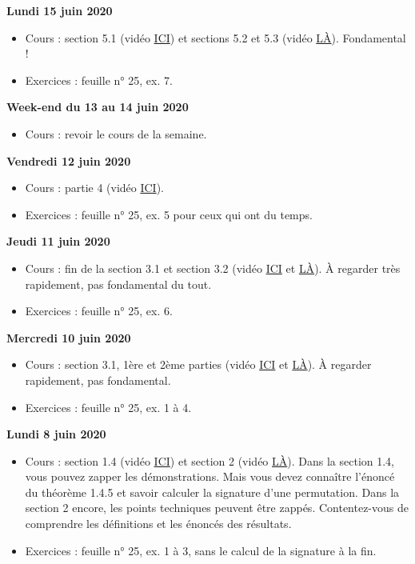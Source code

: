 \documentclass[12pt,a4paper]{article}
\begin{document}
\noindent\textbf{Lundi 15 juin 2020}
\begin{itemize}
\item Cours : section 5.1 (vidéo \href{https://youtu.be/vB5FzVZpJkY}{ ICI}) et sections 5.2 et 5.3  (vidéo \href{https://youtu.be/1X3qrp7tlSw}{ LÀ}). Fondamental !
\item Exercices : feuille n° 25, ex. 7.\vspace{.4cm}
\end{itemize}

\noindent\textbf{Week-end du 13 au 14 juin 2020}
\begin{itemize}
\item Cours : revoir le cours de la semaine.\vspace{.4cm}
\end{itemize}

\noindent\textbf{Vendredi 12 juin 2020}
\begin{itemize}
\item Cours : partie 4 (vidéo \href{https://youtu.be/bxy6vg6_DS0}{ ICI}).
\item Exercices : feuille n° 25, ex. 5 pour ceux qui ont du temps.\vspace{.4cm}
\end{itemize}

\noindent\textbf{Jeudi 11 juin 2020}
\begin{itemize}
\item Cours : fin de la section 3.1 et section 3.2 (vidéo \href{https://youtu.be/LjDFfUYnHZk}{ ICI} et \href{https://youtu.be/-pnLRj_3loA}{ LÀ}). À regarder très rapidement, pas fondamental du tout.
\item Exercices : feuille n° 25, ex. 6.\vspace{.4cm}
\end{itemize}
 
\noindent\textbf{Mercredi 10 juin 2020}
\begin{itemize}
\item Cours : section 3.1, 1ère et 2ème parties (vidéo \href{https://youtu.be/pv299BRWnXQ}{ ICI} et \href{https://youtu.be/LRI5gsSShV4}{ LÀ}). À regarder rapidement, pas fondamental.
\item Exercices : feuille n° 25, ex. 1 à 4.\vspace{.4cm}
\end{itemize}

\noindent\textbf{Lundi 8 juin 2020}
\begin{itemize}
\item Cours : section 1.4 (vidéo \href{https://youtu.be/iMoYlN1wqKA}{ ICI}) et section 2 (vidéo \href{https://youtu.be/22HK-I6wIm8}{ LÀ}). Dans la section 1.4, vous pouvez zapper les démonstrations. Mais vous devez connaître l'énoncé du théorème 1.4.5 et savoir calculer la signature d'une permutation. Dans la section 2 encore, les points techniques peuvent être zappés. Contentez-vous de comprendre les définitions et les énoncés des résultats.
\item Exercices : feuille n° 25, ex. 1 à 3, sans le calcul de la signature à la fin.\vspace{.4cm}
\end{itemize}
\end{document}

